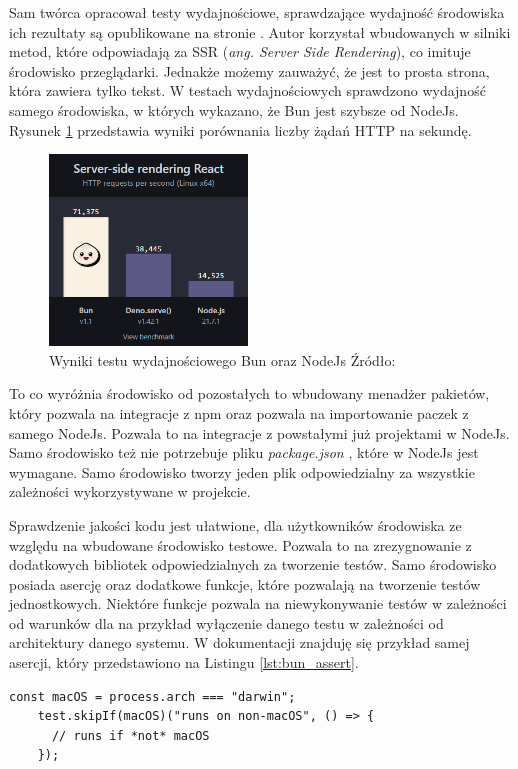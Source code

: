 Sam twórca opracował testy wydajnościowe, sprawdzające wydajność środowiska ich rezultaty są opublikowane na stronie \cite{bun_test}. Autor korzystał wbudowanych w silniki metod, które odpowiadają za SSR (\textit{ang. Server Side Rendering}), co imituje środowisko przeglądarki. Jednakże możemy zauważyć, że jest to prosta strona, która zawiera tylko tekst. W testach wydajnościowych sprawdzono wydajność samego środowiska, w których wykazano, że Bun jest szybsze od NodeJs. Rysunek \ref{fig:bun_bench} przedstawia wyniki porównania liczby żądań HTTP na sekundę.

\begin{figure}[H]
  \centering
  \includegraphics[width=0.47\textwidth]{Figures/bun_bench.png}
  \caption{Wyniki testu wydajnościowego Bun oraz NodeJs Źródło: \cite{bun_test}}
  \label{fig:bun_bench}
\end{figure}

To co wyróżnia środowisko od pozostałych to wbudowany menadżer pakietów, który pozwala na integracje z npm \cite{npm} oraz pozwala na importowanie paczek z samego NodeJs. Pozwala to na integracje z powstałymi już projektami w NodeJs. Samo środowisko też nie potrzebuje pliku \textit{package.json} \cite{package_structure}, które w NodeJs jest wymagane. Samo środowisko tworzy jeden plik odpowiedzialny za wszystkie zależności wykorzystywane w projekcie.

Sprawdzenie jakości kodu jest ułatwione, dla użytkowników środowiska ze względu na wbudowane środowisko testowe. Pozwala to na zrezygnowanie z dodatkowych bibliotek odpowiedzialnych za tworzenie testów. Samo środowisko posiada asercję oraz dodatkowe funkcje, które pozwalają na tworzenie testów jednostkowych. Niektóre funkcje pozwala na niewykonywanie testów w zależności od warunków dla na przykład wyłączenie danego testu w zależności od architektury danego systemu. W dokumentacji znajduję się przykład samej asercji, który przedstawiono na Listingu \ref{lst:bun_assert}.

\begin{centering}
  \begin{lstlisting}[caption={Przykład asercji w środowisku Bun},label={lst:bun_assert},captionpos=b]
    const macOS = process.arch === "darwin";
    test.skipIf(macOS)("runs on non-macOS", () => {
      // runs if *not* macOS
    });
  \end{lstlisting}
\end{centering}


